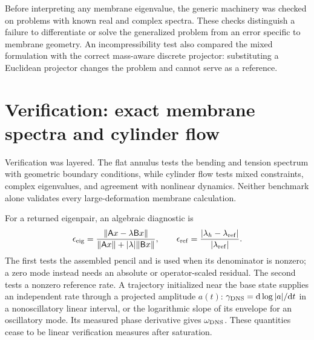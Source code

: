 Before interpreting any membrane eigenvalue, the generic machinery was checked on problems with known real and complex spectra. These checks distinguish a failure to differentiate or solve the generalized problem from an error specific to membrane geometry. An incompressibility test also compared the mixed formulation with the correct mass-aware discrete projector: substituting a Euclidean projector changes the problem and cannot serve as a reference.






\section{Verification: exact membrane spectra and cylinder flow}\label{sec:validation}
Verification was layered. The flat annulus tests the bending and tension spectrum with geometric boundary conditions, while cylinder flow tests mixed constraints, complex eigenvalues, and agreement with nonlinear dynamics. Neither benchmark alone validates every large-deformation membrane calculation.


For a returned eigenpair, an algebraic diagnostic is
\begin{equation}
\epsilon_{\rm eig}=\frac{\|\mathsf Ax-\lambda\mathsf Bx\|}
{\|\mathsf Ax\|+|\lambda|\|\mathsf Bx\|},\qquad
\epsilon_{\rm ref}=\frac{|\lambda_h-\lambda_{\rm ref}|}{|\lambda_{\rm ref}|}.
\label{eq:verification-errors}
\end{equation}
The first tests the assembled pencil and is used when its denominator is nonzero; a zero mode instead needs an absolute or operator-scaled residual. The second tests a nonzero reference rate. A trajectory initialized near the base state supplies an independent rate through a projected amplitude $a(t)$: $\gamma_{\rm DNS}=\mathrm{d}\log|a|/\mathrm{d} t$ in a nonoscillatory linear interval, or the logarithmic slope of its envelope for an oscillatory mode. Its measured phase derivative gives $\omega_{\rm DNS}$. These quantities cease to be linear verification measures after saturation.

